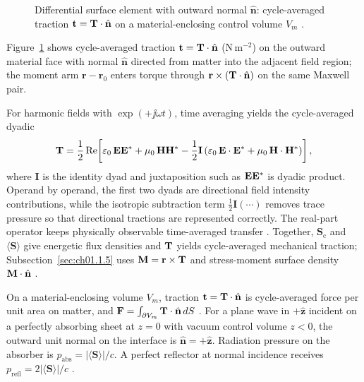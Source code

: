 \begin{figure}[t]
\centering
\VolIPhysFig{\VolIPhysStressTraction}
\caption{Differential surface element with outward normal $\hat{\mathbf{n}}$: cycle-averaged traction $\mathbf{t}=\mathbf{T}\cdot\hat{\mathbf{n}}$ on a material-enclosing control volume $V_m$ \cite{maxwell1873,stratton1941}.}
\label{fig:ch1.stress-traction-element}
\end{figure}

Figure~\ref{fig:ch1.stress-traction-element} shows cycle-averaged traction $\mathbf{t}=\mathbf{T}\cdot\hat{\mathbf{n}}$ (N\,m$^{-2}$) on the outward material face with normal $\hat{\mathbf{n}}$ directed from matter into the adjacent field region; the moment arm $\mathbf{r}-\mathbf{r}_0$ enters torque through $\mathbf{r}\times(\mathbf{T}\cdot\hat{\mathbf{n}})$ on the same Maxwell pair.

For harmonic fields with $\exp(+\jj\omega t)$, time averaging yields the cycle-averaged dyadic
\begin{equation}
\label{eq:ch1.maxwell-stress}
\mathbf{T}
=\frac{1}{2}\Re\!\left[
\varepsilon_0\,\mathbf{E}\mathbf{E}^*
+\mu_0\,\mathbf{H}\mathbf{H}^*
-\frac{1}{2}\mathbf{I}
\left(\varepsilon_0\,\mathbf{E}\cdot\mathbf{E}^*+\mu_0\,\mathbf{H}\cdot\mathbf{H}^*\right)
\right],
\end{equation}
where \(\mathbf{I}\) is the identity dyad and juxtaposition such as \(\mathbf{E}\mathbf{E}^*\)
is dyadic product. Operand by operand, the first two dyads are directional field
intensity contributions, while the isotropic subtraction term
\(\tfrac{1}{2}\mathbf{I}(\cdots)\) removes trace pressure so that directional
tractions are represented correctly. The real-part operator keeps physically
observable time-averaged transfer \cite{stratton1941}.
Together, $\mathbf{S}_\mathrm{c}$ and $\langle\mathbf{S}\rangle$ give energetic flux densities and $\mathbf{T}$ yields cycle-averaged mechanical traction; Subsection~\ref{sec:ch01.1.5} uses $\mathbf{M}=\mathbf{r}\times\mathbf{T}$ and stress-moment surface density $\mathbf{M}\cdot\hat{\mathbf{n}}$ \cite{poynting1884}.

On a material-enclosing volume $V_m$, traction $\mathbf{t}=\mathbf{T}\cdot\hat{\mathbf{n}}$ is cycle-averaged force per unit area on matter, and $\mathbf{F}=\int_{\partial V_m}\mathbf{T}\cdot\hat{\mathbf{n}}\,dS$ \cite{stratton1941}.
For a plane wave in $+\hat{\mathbf{z}}$ incident on a perfectly absorbing sheet at
$z=0$ with vacuum control volume $z<0$, the outward unit normal on the interface is
$\hat{\mathbf{n}}=+\hat{\mathbf{z}}$. Radiation pressure on the absorber is
$p_{\mathrm{abs}}=|\langle\mathbf{S}\rangle|/c$. A perfect reflector at normal incidence receives
$p_{\mathrm{refl}}=2|\langle\mathbf{S}\rangle|/c$ \cite{stratton1941,maxwell1873}.

